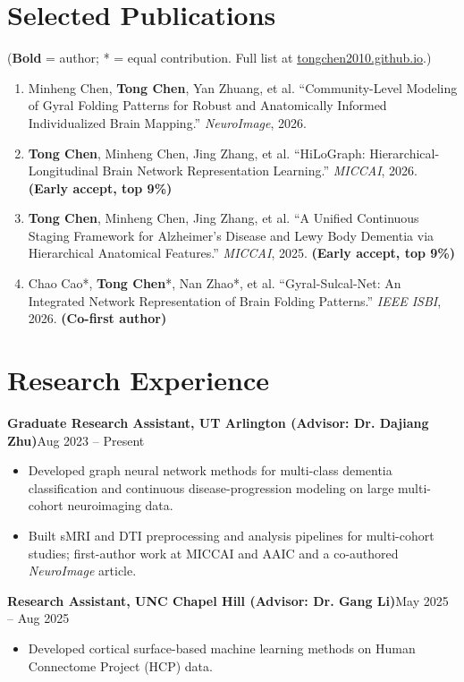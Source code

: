 \documentclass[11pt]{article}
\newcommand{\dated}[2]{\textbf{#1}\hfill #2\par}
\begin{document}
\section{Selected Publications}
{\small (\textbf{Bold} = author; * = equal contribution. Full list at
\href{https://tongchen2010.github.io/publications/}{tongchen2010.github.io}.)}
\begin{enumerate}
  \item Minheng Chen, \textbf{Tong Chen}, Yan Zhuang, et al. ``Community-Level Modeling of
        Gyral Folding Patterns for Robust and Anatomically Informed Individualized Brain
        Mapping.'' \textit{NeuroImage}, 2026.
  \item \textbf{Tong Chen}, Minheng Chen, Jing Zhang, et al. ``HiLoGraph: Hierarchical-
        Longitudinal Brain Network Representation Learning.'' \textit{MICCAI}, 2026.
        \textbf{(Early accept, top 9\%)}
  \item \textbf{Tong Chen}, Minheng Chen, Jing Zhang, et al. ``A Unified Continuous Staging
        Framework for Alzheimer's Disease and Lewy Body Dementia via Hierarchical Anatomical
        Features.'' \textit{MICCAI}, 2025. \textbf{(Early accept, top 9\%)}
  \item Chao Cao*, \textbf{Tong Chen}*, Nan Zhao*, et al. ``Gyral-Sulcal-Net: An Integrated
        Network Representation of Brain Folding Patterns.'' \textit{IEEE ISBI}, 2026.
        \textbf{(Co-first author)}
\end{enumerate}

\section{Research Experience}
\dated{Graduate Research Assistant, UT Arlington (Advisor: Dr. Dajiang Zhu)}{Aug 2023 -- Present}
\begin{itemize}
  \item Developed graph neural network methods for multi-class dementia classification and
        continuous disease-progression modeling on large multi-cohort neuroimaging data.
  \item Built sMRI and DTI preprocessing and analysis pipelines for multi-cohort studies;
        first-author work at MICCAI and AAIC and a co-authored \textit{NeuroImage} article.
\end{itemize}
\vspace{2pt}
\dated{Research Assistant, UNC Chapel Hill (Advisor: Dr. Gang Li)}{May 2025 -- Aug 2025}
\begin{itemize}
  \item Developed cortical surface-based machine learning methods on Human Connectome
        Project (HCP) data.
\end{itemize}
\end{document}
